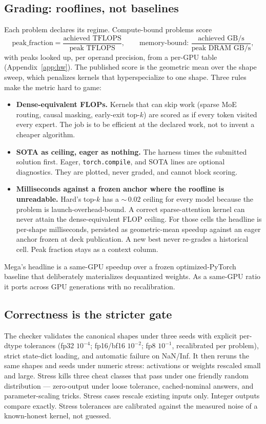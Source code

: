\documentclass[11pt]{article}
\begin{document}
\subsection{Grading: rooflines, not baselines}
\label{sec:metric}

Each problem declares its regime. Compute-bound problems score
\[
\text{peak\_fraction} = \frac{\text{achieved TFLOPS}}{\text{peak TFLOPS}},
\qquad
\text{memory-bound: } \frac{\text{achieved GB/s}}{\text{peak DRAM GB/s}},
\]
with peaks looked up, per operand precision, from a per-GPU table (Appendix~\ref{app:hw}). The published score is the geometric mean over the shape sweep, which penalizes kernels that hyperspecialize to one shape. Three rules make the metric hard to game:

\begin{itemize}
\item \textbf{Dense-equivalent FLOPs.} Kernels that can skip work (sparse MoE routing, causal masking, early-exit top-$k$) are scored as if every token visited every expert. The job is to be efficient at the declared work, not to invent a cheaper algorithm.
\item \textbf{SOTA as ceiling, eager as nothing.} The harness times the submitted solution first. Eager, \texttt{torch.compile}, and SOTA lines are optional diagnostics. They are plotted, never graded, and cannot block scoring.
\item \textbf{Milliseconds against a frozen anchor where the roofline is unreadable.} Hard's top-$k$ has a ${\sim}\,0.02$ ceiling for every model because the problem is launch-overhead-bound. A correct sparse-attention kernel can never attain the dense-equivalent FLOP ceiling. For those cells the headline is per-shape milliseconds, persisted as geometric-mean speedup against an eager anchor frozen at deck publication. A new best never re-grades a historical cell. Peak fraction stays as a context column.
\end{itemize}

Mega's headline is a same-GPU speedup over a frozen optimized-PyTorch baseline that deliberately materializes dequantized weights. As a same-GPU ratio it ports across GPU generations with no recalibration.

\subsection{Correctness is the stricter gate}
\label{sec:correctness}

The checker validates the canonical shapes under three seeds with explicit per-dtype tolerances (fp32 $10^{-4}$; fp16/bf16 $10^{-2}$; fp8 $10^{-1}$, recalibrated per problem), strict state-dict loading, and automatic failure on NaN/Inf. It then reruns the same shapes and seeds under numeric stress: activations or weights rescaled small and large. Stress kills three cheat classes that pass under one friendly random distribution --- zero-output under loose tolerance, cached-nominal answers, and parameter-scaling tricks. Stress cases rescale existing inputs only. Integer outputs compare exactly. Stress tolerances are calibrated against the measured noise of a known-honest kernel, not guessed.
\end{document}
